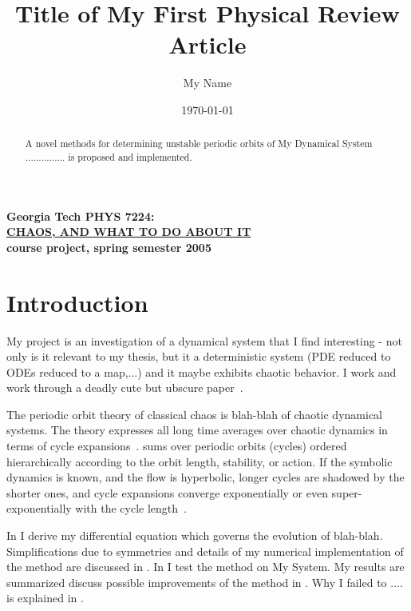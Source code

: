 \documentclass[pre,twocolumn,groupedaddress,showpacs,showkeys]{revtex4}
\begin{document}
				\title{
Title of My First Physical Review Article
				}\author{
My Name				}
				\date{\today} %

				\begin{abstract}
A novel methods for determining unstable periodic orbits of 
My Dynamical System ...............
is proposed and implemented. 

\end{abstract}
					\maketitle

\noindent
{\bf Georgia Tech PHYS 7224:}\\
\underline{\bf CHAOS, AND WHAT TO DO ABOUT IT }\\
{\bf course project, spring semester 2005}

\section{Introduction}

   My project is an investigation of a dynamical system
   that I find interesting - not only is it relevant to
   my thesis, but it 
   a deterministic system (PDE reduced to ODEs reduced to a map,...) and
   it maybe exhibits chaotic behavior. I work and work through
   a deadly cute but ubscure paper~\cite{einstein}.

The periodic orbit theory of classical chaos
is blah-blah of chaotic dynamical systems. 
The theory expresses all long time averages over chaotic
dynamics in terms of cycle expansions~\cite{DasBuch,PG97}.
sums over
periodic orbits  (cycles) 
ordered hierarchically according to the orbit length, stability, or action. 
If the symbolic dynamics is known, and the flow is
hyperbolic, longer cycles are shadowed by the shorter ones, and
cycle expansions converge  exponentially or even 
super-exponentially with the cycle length~\cite{Rugh92}. 


    In  I derive my differential equation
which governs the evolution of blah-blah.
Simplifications due to symmetries and details of my
numerical implementation of the method are discussed in . 
In  I test
the method on My System.
My results are summarized
discuss possible improvements of the method in .
Why I failed to .... is explained in .
\end{document}
